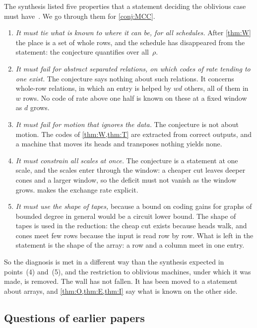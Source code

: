 The synthesis listed five properties that a statement deciding the oblivious case must
have~\cite[Section~4.4]{SeventeenthPaper2026}. We go through them for \cref{conj:MCC}.
\begin{enumerate}[label=(\arabic*),leftmargin=2em]
\item \emph{It must tie what is known to where it can be, for all schedules.} After \cref{thm:W} the place is a set of
whole rows, and the schedule has disappeared from the statement: the conjecture quantifies over all~$\rho$.
\item \emph{It must fail for abstract separated relations, on which codes of rate tending to one exist.} The
conjecture says nothing about such relations. It concerns whole-row relations, in which an entry is helped by $wd$
others, all of them in $w$ rows. No code of rate above one half is known on these at a fixed window as $d$ grows.
\item \emph{It must fail for motion that ignores the data.} The conjecture is not about motion. The codes of
\cref{thm:W,thm:T} are extracted from correct outputs, and a machine that moves its heads and transposes nothing yields
none.
\item \emph{It must constrain all scales at once.} The conjecture is a statement at one scale, and the scales enter
through the window: a cheaper cut leaves deeper cones and a larger window, so the deficit must not vanish as the
window grows.  makes the exchange rate explicit.
\item \emph{It must use the shape of tapes,} because a bound on coding gains for graphs of bounded degree in general
would be a circuit lower bound. The shape of tapes is used in the reduction: the cheap cut exists because heads walk,
and cones meet few rows because the input is read row by row. What is left in the statement is the shape of the
array: a row and a column meet in one entry.
\end{enumerate}
So the diagnosis is met in a different way than the synthesis expected in points~(4) and~(5), and the restriction to
oblivious machines, under which it was made, is removed. The wall has not fallen. It has been moved to a statement
about arrays, and \cref{thm:O,thm:E,thm:I} say what is known on the other side.

\subsection{Questions of earlier papers}\label{sec:intro-questions}

